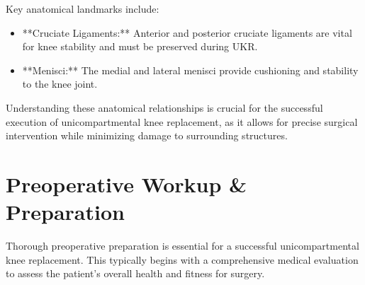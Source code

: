 Key anatomical landmarks include:

\begin{itemize}
  \item **Cruciate Ligaments:** Anterior and posterior cruciate ligaments are vital for knee stability and must be preserved during UKR.
  \item **Menisci:** The medial and lateral menisci provide cushioning and stability to the knee joint.
\end{itemize}

Understanding these anatomical relationships is crucial for the successful execution of unicompartmental knee replacement, as it allows for precise surgical intervention while minimizing damage to surrounding structures.

\section*{Preoperative Workup \& Preparation}
Thorough preoperative preparation is essential for a successful unicompartmental knee replacement. This typically begins with a comprehensive medical evaluation to assess the patient's overall health and fitness for surgery.

